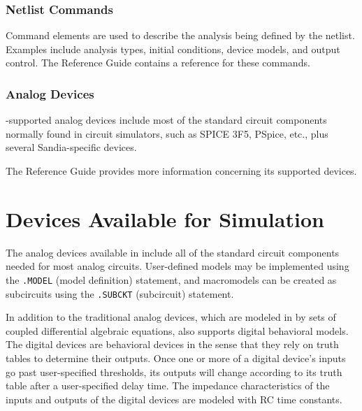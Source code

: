 \subsubsection{Netlist Commands}
Command elements are used to describe the
analysis being defined by the netlist.  Examples include analysis types,
initial conditions, device models, and output control.
The \Xyce{} Reference Guide\ReferenceGuide{} contains a reference for these commands.


\subsubsection{Analog Devices}
\Xyce{}-supported analog devices
include most of the standard circuit components normally found in circuit
simulators, such as SPICE 3F5, PSpice, etc., plus several Sandia-specific
devices.


The \Xyce{} Reference Guide\ReferenceGuide{} provides more information concerning its supported devices.

\section{Devices Available for Simulation}
\label{Available_Devices}

The analog devices available in \Xyce{} include all of the standard circuit
components needed for most analog circuits.  User-defined models may be
implemented using the 
\texttt{.MODEL} (model definition) statement, and macromodels can be created as
subcircuits using the 
\texttt{.SUBCKT} (subcircuit) statement.

In addition to the traditional analog devices, which are modeled in \Xyce{} by
sets of coupled differential algebraic equations, \Xyce{} also supports digital
  
behavioral models. The digital devices are behavioral devices in the sense that
they rely on truth tables to determine their outputs. Once one or more of a
digital device's inputs go past user-specified thresholds, its outputs will
change according to its truth table after a user-specified delay time. The
impedance characteristics of the inputs and outputs of the digital devices are
modeled with RC time constants. 

